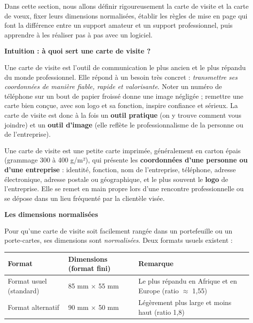 \documentclass[11pt]{article}
\newcommand{\cle}[1]{{\popxbold\color{popdark}#1}}
\newcounter{popsec}
\newcounter{popsub}
\newcommand{\courssub}[1]{%
  \stepcounter{popsub}%
  \par\vspace{9pt}\noindent{\popxbold\fontsize{11.5}{13}\selectfont\color{popink}{\color{poporange}\thepopsec.\thepopsub}\hspace{6pt}#1}\par\nopagebreak\vspace{4pt}
}
\begin{document}
Dans cette section, nous allons définir rigoureusement la carte de visite et la carte de vœux, fixer leurs dimensions normalisées, établir les règles de mise en page qui font la différence entre un support amateur et un support professionnel, puis apprendre à les réaliser pas à pas avec un logiciel.

\courssub{La carte de visite}

\textbf{Intuition : à quoi sert une carte de visite ?}

Une carte de visite est l'outil de communication le plus ancien et le plus répandu du monde professionnel. Elle répond à un besoin très concret : \emph{transmettre ses coordonnées de manière fiable, rapide et valorisante}. Noter un numéro de téléphone sur un bout de papier froissé donne une image négligée ; remettre une carte bien conçue, avec son logo et sa fonction, inspire confiance et sérieux. La carte de visite est donc à la fois un \textbf{outil pratique} (on y trouve comment vous joindre) et un \textbf{outil d'image} (elle reflète le professionnalisme de la personne ou de l'entreprise).

\begin{definition}
Une \cle{carte de visite} est une petite carte imprimée, généralement en carton épais (grammage 300 à 400 g/m²), qui présente les \textbf{coordonnées d'une personne ou d'une entreprise} : identité, fonction, nom de l'entreprise, téléphone, adresse électronique, adresse postale ou géographique, et le plus souvent le \textbf{logo} de l'entreprise. Elle se remet en main propre lors d'une rencontre professionnelle ou se dépose dans un lieu fréquenté par la clientèle visée.
\end{definition}

\textbf{Les dimensions normalisées}

Pour qu'une carte de visite soit facilement rangée dans un portefeuille ou un porte-cartes, ses dimensions sont \emph{normalisées}. Deux formats usuels existent :

\begin{center}
\begin{tabularx}{\linewidth}{|l|X|X|}\hline
\rowcolor{popblueL}
\textbf{Format} & \textbf{Dimensions (format fini)} & \textbf{Remarque} \\\hline
Format usuel (standard) & 85 mm $\times$ 55 mm & Le plus répandu en Afrique et en Europe (ratio $\approx$ 1,55) \\\hline
Format alternatif & 90 mm $\times$ 50 mm & Légèrement plus large et moins haut (ratio 1,8) \\\hline
\end{tabularx}
\end{center}
\end{document}
